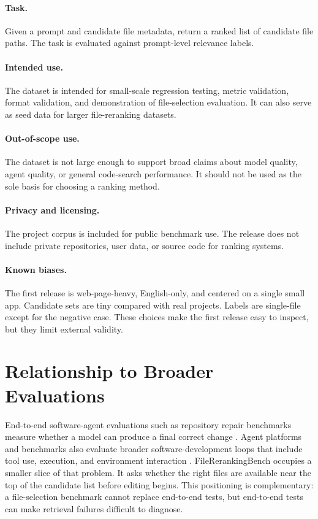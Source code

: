 \documentclass[11pt,a4paper]{article}
\begin{document}
\paragraph{Task.}
Given a prompt and candidate file metadata, return a ranked list of candidate
file paths. The task is evaluated against prompt-level relevance labels.

\paragraph{Intended use.}
The dataset is intended for small-scale regression testing, metric validation,
format validation, and demonstration of file-selection evaluation. It can also
serve as seed data for larger file-reranking datasets.

\paragraph{Out-of-scope use.}
The dataset is not large enough to support broad claims about model quality,
agent quality, or general code-search performance. It should not be used as the
sole basis for choosing a ranking method.

\paragraph{Privacy and licensing.}
The project corpus is included for public benchmark use. The release does not
include private repositories, user data, or source code for ranking systems.

\paragraph{Known biases.}
The first release is web-page-heavy, English-only, and centered on a single
small app. Candidate sets are tiny compared with real projects. Labels are
single-file except for the negative case. These choices make the first release
easy to inspect, but they limit external validity.

\section{Relationship to Broader Evaluations}

End-to-end software-agent evaluations such as repository repair benchmarks
measure whether a model can produce a final correct change
\cite{jimenez2024swebench}. Agent platforms and benchmarks also evaluate
broader software-development loops that include tool use, execution, and
environment interaction \cite{wang2025openhands}. FileRerankingBench occupies a
smaller slice of that problem. It asks whether the right files are available
near the top of the candidate list before editing begins. This positioning is
complementary: a file-selection benchmark cannot replace end-to-end tests, but
end-to-end tests can make retrieval failures difficult to diagnose.
\end{document}
